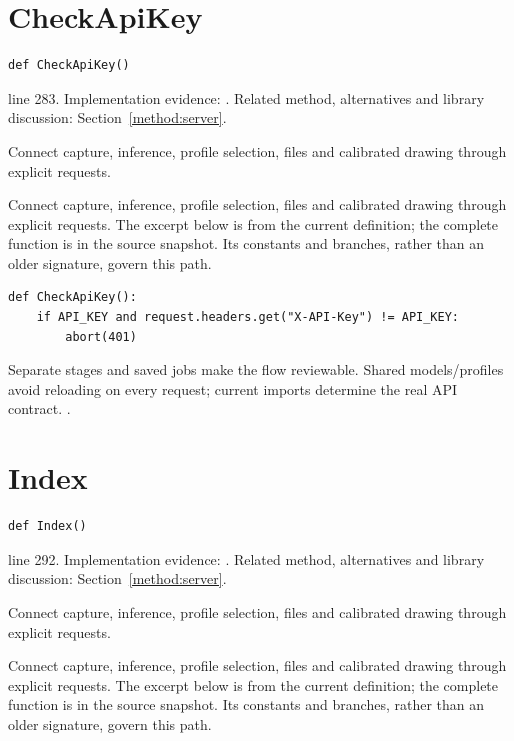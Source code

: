 \section{CheckApiKey}\label{fn:web-server:CheckApiKey}
\begin{lstlisting}[style=sig]
def CheckApiKey()
\end{lstlisting}
 line 283. Implementation evidence: \cite{code2026}. Related method, alternatives and library discussion: Section~\ref{method:server}.


Connect capture, inference, profile selection, files and calibrated drawing through explicit requests.


Connect capture, inference, profile selection, files and calibrated drawing through explicit requests. The excerpt below is from the current definition; the complete function is in the source snapshot. Its constants and branches, rather than an older signature, govern this path.


\begin{lstlisting}[style=plain]
def CheckApiKey():
    if API_KEY and request.headers.get("X-API-Key") != API_KEY:
        abort(401)
\end{lstlisting}
Separate stages and saved jobs make the flow reviewable. Shared models/profiles avoid reloading on every request; current imports determine the real API contract. \cite{flaskdocs,pillowops,code2026}.


\section{Index}\label{fn:web-server:Index}
\begin{lstlisting}[style=sig]
def Index()
\end{lstlisting}
 line 292. Implementation evidence: \cite{code2026}. Related method, alternatives and library discussion: Section~\ref{method:server}.


Connect capture, inference, profile selection, files and calibrated drawing through explicit requests.


Connect capture, inference, profile selection, files and calibrated drawing through explicit requests. The excerpt below is from the current definition; the complete function is in the source snapshot. Its constants and branches, rather than an older signature, govern this path.


